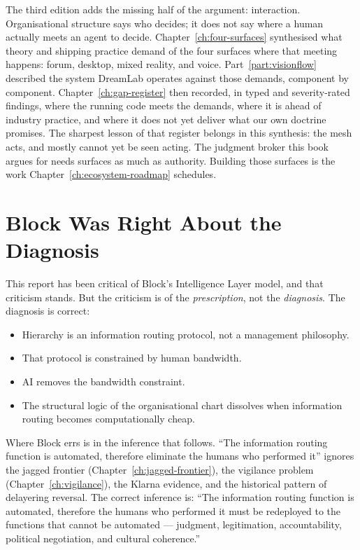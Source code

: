 The third edition adds the missing half of the argument: interaction. Organisational structure says who decides; it does not say where a human actually meets an agent to decide. Chapter~\ref{ch:four-surfaces} synthesised what theory and shipping practice demand of the four surfaces where that meeting happens: forum, desktop, mixed reality, and voice. Part~\ref{part:visionflow} described the system DreamLab operates against those demands, component by component. Chapter~\ref{ch:gap-register} then recorded, in typed and severity-rated findings, where the running code meets the demands, where it is ahead of industry practice, and where it does not yet deliver what our own doctrine promises. The sharpest lesson of that register belongs in this synthesis: the mesh acts, and mostly cannot yet be seen acting. The judgment broker this book argues for needs surfaces as much as authority. Building those surfaces is the work Chapter~\ref{ch:ecosystem-roadmap} schedules.

\section{Block Was Right About the Diagnosis}

This report has been critical of Block's Intelligence Layer model, and that criticism stands. But the criticism is of the \emph{prescription}, not the \emph{diagnosis}. The diagnosis is correct:

\begin{itemize}
  \item Hierarchy is an information routing protocol, not a management philosophy.
  \item That protocol is constrained by human bandwidth.
  \item AI removes the bandwidth constraint.
  \item The structural logic of the organisational chart dissolves when information routing becomes computationally cheap.
\end{itemize}

Where Block errs is in the inference that follows. ``The information routing function is automated, therefore eliminate the humans who performed it'' ignores the jagged frontier (Chapter~\ref{ch:jagged-frontier}), the vigilance problem (Chapter~\ref{ch:vigilance}), the Klarna evidence, and the historical pattern of delayering reversal. The correct inference is: ``The information routing function is automated, therefore the humans who performed it must be redeployed to the functions that cannot be automated --- judgment, legitimation, accountability, political negotiation, and cultural coherence.''

